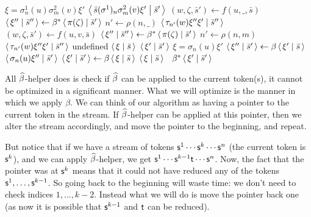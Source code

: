\documentclass{llncs}
\newcounter{algo}
\begin{document}
\def\bhelp{\hbox{\tencsc$\hb$-helper}}
\begin{algo}[h]
\algorithm
        \State $\xi = \sigma^1_n(u)\sigma^2_m(v)\xi'$
        \lIf{$\sigma^1\in\termp$} \Return $\gen{\bar s(\sigma^1)_n\sigma^2_m(v)\xi'}[\bar s']$
            \State $(w,\zeta,\bar s')\gets f(u,\_,\bar s)$
            \State $\gen{\xi''}[\bar s'']\gets\beta^*\gen{\pi(\zeta)}[\bar s']$
            \State $n'\gets \rho(n,\_)$
            \State\Return $\gen{\tau_{n'}(w)\xi''\xi'}[\bar s'']$
            \State $(w,\zeta,\bar s')\gets f(u,v,\bar s)$
            \State $\gen{\xi''}[\bar s'']\gets\beta^*\gen{\pi(\zeta)}[\bar s']$
            \State $n'\gets \rho(n,m)$
            \State\Return $\gen{\tau_{n'}(w)\xi''\xi'}[\bar s'']$
        \Else
            \State\Return undefined
        \EndIf
    \EndFunc
    \nonum\State
        \If{$\xi=\epsilon$} \Return $\gen\xi[\bar s]$
        \ElseIf{$\bhelp\gen\xi[\bar s]=\gen{\xi'}[\bar s']$ is defined}
            \Return $\gen{\xi'}[\bar s']$
        \Else
            \State $\xi=\sigma_n(u)\xi'$
            \State $\gen{\xi''}[\bar s']\gets\beta\gen{\xi'}[\bar s]$
            \State\Return $\gen{\sigma_n(u)\xi''}[\bar s']$
        \EndIf
    \EndFunc
    \nonum\State
        \State $\gen{\xi'}[\bar s']\gets\beta\gen\xi[\bar s]$
         \Return $\gen\xi[\bar s]$
        \Else\ \Return $\beta^*\gen{\xi'}[\bar s']$
        \EndIf
    \EndFunc
\ealgorithm
\end{algo}

All \bhelp{} does is check if $\widehat\beta$ can be applied to the current token(s), it cannot be optimized in a significant manner.
What we will optimize is the manner in which we apply $\beta$.
We can think of our algorithm as having a pointer to the current token in the stream.
If \bhelp{} can be applied at this pointer, then we alter the stream accordingly, and move the pointer to the beginning, and
repeat.

But notice that if we have a stream of tokens $\mathsf{s}^1\cdots\mathsf{s}^k\cdots\mathsf{s}^n$ (the current token is $\mathsf{s}^k$), and we can apply \bhelp{}, we get $\mathsf{s}^1\cdots\mathsf{s}^{k-1}\mathsf{t}\cdots\mathsf{s}^n$.
Now, the fact that the pointer was at $\mathsf{s}^k$ means that it could not have reduced any of the tokens $\mathsf{s}^1,\dots,\mathsf{s}^{k-1}$.
So going back to the beginning will waste time: we don't need to check indices $1,\dots,k-2$.
Instead what we will do is move the pointer back one (as now it is possible that $\mathsf{s}^{k-1}$ and $\mathsf{t}$ can be reduced).
\end{document}

